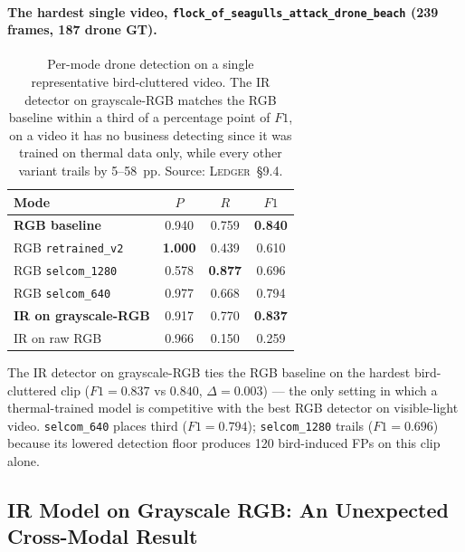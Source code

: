 \paragraph{The hardest single video, \texttt{flock\_of\_seagulls\_attack\_drone\_beach} (239 frames, 187 drone GT).}

\begin{table}[htbp]
    \centering
    \caption{Per-mode drone detection on a single representative bird-cluttered video. The IR detector on grayscale-RGB matches the RGB baseline within a third of a percentage point of $F1$, on a video it has no business detecting since it was trained on thermal data only, while every other variant trails by 5--58~pp. Source: \textsc{Ledger}~\S9.4.}
    \label{tab:realvideo_seagull}
    \begin{tabular}{lccc}
        \toprule
        Mode & $P$ & $R$ & $F1$ \\
        \midrule
        \textbf{RGB baseline}           & 0.940 & 0.759 & \textbf{0.840} \\
        RGB \texttt{retrained\_v2} & \textbf{1.000} & 0.439 & 0.610 \\
        RGB \texttt{selcom\_1280}  & 0.578 & \textbf{0.877} & 0.696 \\
        RGB \texttt{selcom\_640}   & 0.977 & 0.668 & 0.794 \\
        \textbf{IR on grayscale-RGB} & 0.917 & 0.770 & \textbf{0.837} \\
        IR on raw RGB          & 0.966 & 0.150 & 0.259 \\
        \bottomrule
    \end{tabular}
\end{table}

\noindent The IR detector on grayscale-RGB ties the RGB baseline on the hardest bird-cluttered clip ($F1 = 0.837$ vs $0.840$, $\Delta=0.003$) --- the only setting in which a thermal-trained model is competitive with the best RGB detector on visible-light video. \texttt{selcom\_640} places third ($F1=0.794$); \texttt{selcom\_1280} trails ($F1=0.696$) because its lowered detection floor produces 120 bird-induced FPs on this clip alone.

\subsection{IR Model on Grayscale RGB: An Unexpected Cross-Modal Result}
\label{sec:grayscale}

